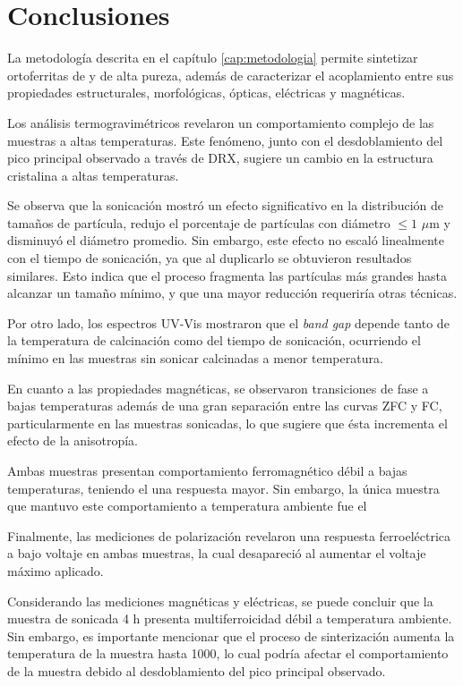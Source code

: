 \documentclass[../main.tex]{subfiles}
\begin{document}
\chapter{Conclusiones}
La metodología descrita en el capítulo \ref{cap:metodologia} permite sintetizar ortoferritas de \neod{} y \sama{} de alta pureza, además de caracterizar el acoplamiento entre sus propiedades estructurales, morfológicas, ópticas, eléctricas y magnéticas.

Los análisis termogravimétricos revelaron un comportamiento complejo de las muestras a altas temperaturas. Este fenómeno, junto con el desdoblamiento del pico principal observado a través de DRX, sugiere un cambio en la estructura cristalina a altas temperaturas.

Se observa que la sonicación mostró un efecto significativo en la distribución de tamaños de partícula, redujo el porcentaje de partículas con diámetro $\leq1$ $\mu$m y disminuyó el diámetro promedio. Sin embargo, este efecto no escaló linealmente con el tiempo de sonicación, ya que al duplicarlo se obtuvieron resultados similares. Esto indica que el proceso fragmenta las partículas más grandes hasta alcanzar un tamaño mínimo, y que una mayor reducción requeriría otras técnicas.

Por otro lado, los espectros UV-Vis mostraron que el \textit{band gap} depende tanto de la temperatura de calcinación como del tiempo de sonicación, ocurriendo el mínimo en las muestras sin sonicar calcinadas a menor temperatura.

En cuanto a las propiedades magnéticas, se observaron transiciones de fase a bajas temperaturas además de una gran separación entre las curvas ZFC y FC, particularmente en las muestras sonicadas, lo que sugiere que ésta incrementa el efecto de la anisotropía.

Ambas muestras presentan comportamiento ferromagnético débil a bajas temperaturas, teniendo el \sama{} una respuesta mayor. Sin embargo, la única muestra que mantuvo este comportamiento a temperatura ambiente fue el \sama{}

Finalmente, las mediciones de polarización revelaron una respuesta ferroeléctrica a bajo voltaje en ambas muestras, la cual desapareció al aumentar el voltaje máximo aplicado.

Considerando las mediciones magnéticas y eléctricas, se puede concluir que la muestra de \sama{} sonicada 4 h presenta multiferroicidad débil a temperatura ambiente. Sin embargo, es importante mencionar que el proceso de sinterización aumenta la temperatura de la muestra hasta 1000\gradoC{}, lo cual podría afectar el comportamiento de la muestra debido al desdoblamiento del pico principal observado.
\end{document}
